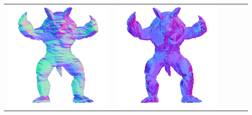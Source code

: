 \begin{center}
\begin{tabularx}{\linewidth}{@{}Y@{}Y@{}Y@{}Y@{}Y@{}Y@{}}
\includegraphics[width=\linewidth]{semisynthetic/20150514_22_yu_out.png} &
\includegraphics[width=\linewidth]{semisynthetic/20150514_22_dpsn_out.png} &

\end{tabularx}
\end{center}
